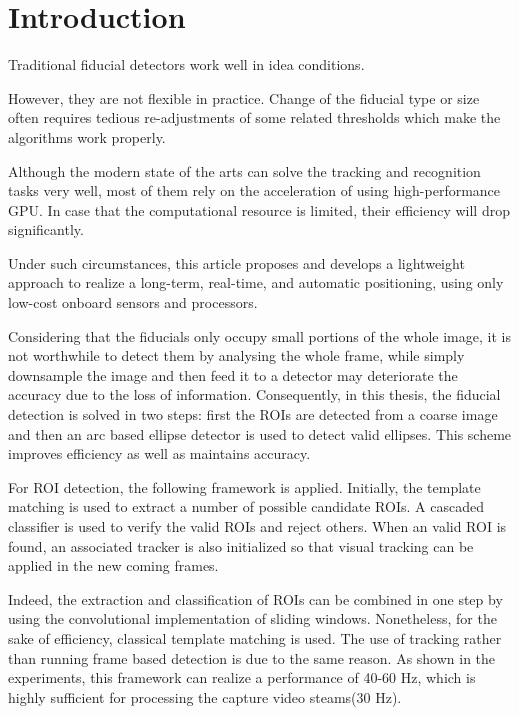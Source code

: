 \documentclass[a4paper]{report}
\begin{document}
\section{Introduction}

Traditional fiducial detectors work well in idea conditions. 

However, they are not flexible in practice. Change of the fiducial type or size often requires tedious re-adjustments of some related thresholds which make the algorithms work properly.



Although the modern state of the arts can solve the tracking and recognition tasks very well, most of them rely on the acceleration of using high-performance GPU. In case that the computational resource is limited, their efficiency will drop significantly.

Under such circumstances, this article proposes and develops a lightweight approach to realize a long-term, real-time, and automatic positioning, using only low-cost onboard sensors and processors.

Considering that the fiducials only occupy small portions of the whole image, it is not worthwhile to detect them by analysing the whole frame, while simply downsample the image and then feed it to a detector may deteriorate the accuracy due to the loss of information. Consequently, in this thesis, the fiducial detection is solved in two steps: first the ROIs are detected from a coarse image and then an arc based ellipse detector is used to detect valid ellipses. This scheme improves efficiency as well as maintains accuracy. 

For ROI detection, the following framework is applied. Initially, the template matching is used to extract a number of possible candidate ROIs. A cascaded classifier is used to verify the valid ROIs and reject others. When an valid ROI is found, an associated tracker is also initialized so that visual tracking can be applied in the new coming frames. 

Indeed, the extraction and classification of ROIs can be combined in one step by using the convolutional implementation of sliding windows. Nonetheless, for the sake of efficiency, classical template matching is used. The use of tracking rather than running frame based detection is due to the same reason. As shown in the experiments, this framework can realize a performance of 40-60 Hz, which is highly sufficient for processing the capture video steams(30 Hz).
\end{document}
